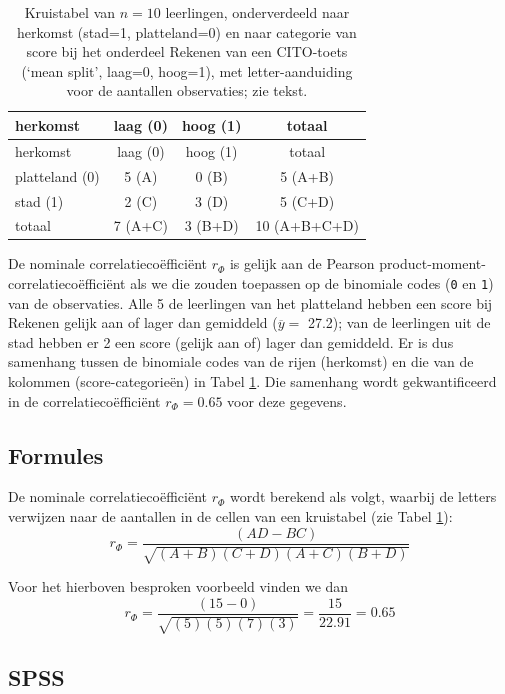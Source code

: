 \documentclass[
]{book}
\begin{document}
\begin{longtable}[]{@{}lccc@{}}
\caption{\label{tab:cito-kruis} Kruistabel van \(n=10\) leerlingen, onderverdeeld naar herkomst
(stad=1, platteland=0) en naar categorie van score bij het onderdeel Rekenen van een
CITO-toets (`mean split', laag=0, hoog=1), met letter-aanduiding voor de aantallen
observaties; zie tekst.}\tabularnewline
\toprule
herkomst & laag (0) & hoog (1) & totaal\tabularnewline
\midrule
\endfirsthead
\toprule
herkomst & laag (0) & hoog (1) & totaal\tabularnewline
\midrule
\endhead
platteland (0) & 5 (A) & 0 (B) & 5 (A+B)\tabularnewline
stad (1) & 2 (C) & 3 (D) & 5 (C+D)\tabularnewline
totaal & 7 (A+C) & 3 (B+D) & 10 (A+B+C+D)\tabularnewline
\bottomrule
\end{longtable}

De nominale correlatiecoëfficiënt \(r_\Phi\) is gelijk aan de Pearson
product-moment-correlatiecoëfficiënt als we die zouden toepassen op de binomiale codes
(\texttt{0} en \texttt{1}) van de observaties. Alle 5 de leerlingen van het platteland
hebben een score bij Rekenen gelijk aan of lager dan gemiddeld
(\(\overline{y}=\) 27.2); van de leerlingen uit de stad hebben er 2 een score
(gelijk aan of) lager dan gemiddeld. Er is dus samenhang tussen de
binomiale codes van de rijen (herkomst) en die van de kolommen
(score-categorieën) in Tabel \ref{tab:cito-kruis}.
Die samenhang wordt gekwantificeerd in de
correlatiecoëfficiënt \(r_\Phi=0.65\) voor deze gegevens.

\hypertarget{formules-5}{%
\subsection{Formules}\label{formules-5}}

De nominale correlatiecoëfficiënt \(r_\Phi\) wordt berekend als volgt,
waarbij de letters verwijzen naar de aantallen in de cellen van een
kruistabel (zie Tabel \ref{tab:cito-kruis}):
\begin{equation}
    r_\Phi = \frac{(AD-BC)}{\sqrt{(A+B)(C+D)(A+C)(B+D)}}
  \label{eq:phi}
\end{equation}

Voor het hierboven besproken voorbeeld vinden we dan
\[
    r_\Phi = \frac{(15-0)}{\sqrt{(5)(5)(7)(3)}} = \frac{15}{22.91} = 0.65
\]

\hypertarget{spss-8}{%
\subsection{SPSS}\label{spss-8}}
\end{document}
